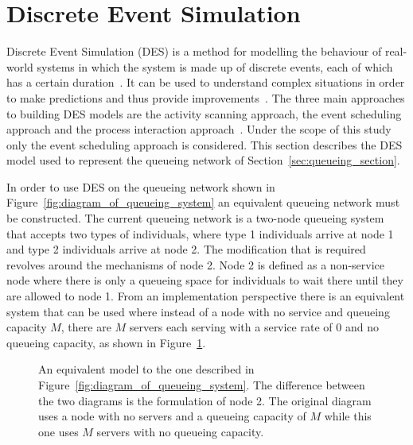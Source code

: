 \section{Discrete Event Simulation}\label{sec:discrete_event_simulation}

Discrete Event Simulation (DES) is a method for modelling the behaviour of
real-world systems in which the system is made up of discrete events, each of
which has a certain duration~\cite{DESstewart}.
It can be used to understand complex situations in order to make predictions
and thus provide improvements~\cite{VinceGeraintBook}.
The three main approaches to building DES models are the activity scanning
approach, the event scheduling approach and the process interaction
approach~\cite{DESapproaches}.
Under the scope of this study only the event scheduling approach is considered.
This section describes the DES model used to
represent the queueing network of Section~\ref{sec:queueing_section}.

In order to use DES on the queueing network shown in
Figure~\ref{fig:diagram_of_queueing_system} an equivalent queueing network must
be constructed.
The current queueing network is a two-node queueing system that accepts two
types of individuals, where type 1 individuals arrive at node 1 and
type 2 individuals arrive at node 2.
The modification that is required revolves around the mechanisms of node 2.
Node 2 is defined as a non-service node where there is only a queueing
space for individuals to wait there until they are allowed to node 1.
From an implementation perspective there is an equivalent system that can be
used where instead of a node with no service and queueing capacity \(M\), there
are \(M\) servers each serving with a service rate of \(0\) and no queueing
capacity, as shown in Figure~\ref{fig:equivalent_diagram_of_queueing_system}.

\begin{figure}[H]
    \centering
    
    \caption{An equivalent model to the one described in
    Figure~\ref{fig:diagram_of_queueing_system}. The difference between the two
    diagrams is the formulation of node 2. The original diagram uses
    a node with no servers and a queueing capacity of \(M\) while this one uses
    \(M\) servers with no queueing capacity.}
    \label{fig:equivalent_diagram_of_queueing_system}
\end{figure}
    

